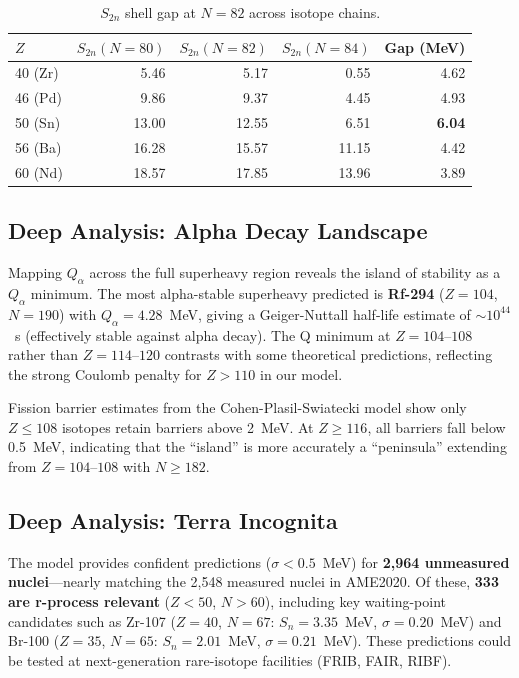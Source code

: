 \documentclass[letterpaper,11pt]{article}
\begin{document}
\begin{table}[h]
\centering
\caption{$S_{2n}$ shell gap at $N=82$ across isotope chains.}
\label{tab:shell_evolution}
\begin{tabular}{lrrrr}
\toprule
$Z$ & $S_{2n}(N{=}80)$ & $S_{2n}(N{=}82)$ & $S_{2n}(N{=}84)$ & Gap (MeV) \\
\midrule
40 (Zr) & 5.46 & 5.17 & 0.55 & 4.62 \\
46 (Pd) & 9.86 & 9.37 & 4.45 & 4.93 \\
50 (Sn) & 13.00 & 12.55 & 6.51 & \textbf{6.04} \\
56 (Ba) & 16.28 & 15.57 & 11.15 & 4.42 \\
60 (Nd) & 18.57 & 17.85 & 13.96 & 3.89 \\
\bottomrule
\end{tabular}
\end{table}

\subsection{Deep Analysis: Alpha Decay Landscape}

Mapping $Q_\alpha$ across the full superheavy region reveals the island of
stability as a $Q_\alpha$ minimum. The most alpha-stable superheavy predicted is
\textbf{Rf-294} ($Z = 104$, $N = 190$) with $Q_\alpha = 4.28$~MeV, giving a
Geiger-Nuttall half-life estimate of $\sim 10^{44}$~s (effectively stable
against alpha decay). The Q minimum at $Z = 104$--$108$ rather than $Z = 114$--$120$
contrasts with some theoretical predictions, reflecting the strong Coulomb
penalty for $Z > 110$ in our model.

Fission barrier estimates from the Cohen-Plasil-Swiatecki model show only $Z \leq 108$
isotopes retain barriers above 2~MeV. At $Z \geq 116$, all barriers fall below
0.5~MeV, indicating that the ``island'' is more accurately a ``peninsula''
extending from $Z = 104$--$108$ with $N \geq 182$.

\subsection{Deep Analysis: Terra Incognita}

The model provides confident predictions ($\sigma < 0.5$~MeV) for
\textbf{2,964 unmeasured nuclei}---nearly matching the 2,548 measured nuclei in
AME2020. Of these, \textbf{333 are r-process relevant} ($Z < 50$, $N > 60$),
including key waiting-point candidates such as Zr-107 ($Z = 40$, $N = 67$:
$S_n = 3.35$~MeV, $\sigma = 0.20$~MeV) and Br-100 ($Z = 35$, $N = 65$:
$S_n = 2.01$~MeV, $\sigma = 0.21$~MeV). These predictions could be tested at
next-generation rare-isotope facilities (FRIB, FAIR, RIBF).
\end{document}
